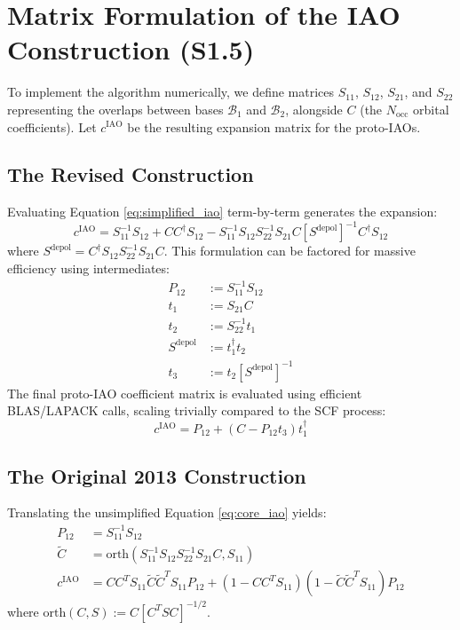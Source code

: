 \documentclass[11pt]{article}
\begin{document}
\vspace{0.5cm}

\section{Matrix Formulation of the IAO Construction (S1.5)}

To implement the algorithm numerically, we define matrices $S_{11}$, $S_{12}$, $S_{21}$, and $S_{22}$ representing the overlaps between bases $\mathcal{B}_1$ and $\mathcal{B}_2$, alongside $C$ (the $N_{\text{occ}}$ orbital coefficients). Let $c^{\text{IAO}}$ be the resulting expansion matrix for the proto-IAOs.

\subsection{The Revised Construction}
Evaluating Equation \ref{eq:simplified_iao} term-by-term generates the expansion:
\begin{equation}
    c^{\text{IAO}} = S_{11}^{-1}S_{12} + C C^\dagger S_{12} - S_{11}^{-1}S_{12}S_{22}^{-1}S_{21}C [S^{\text{depol}}]^{-1} C^\dagger S_{12} \label{eq:S40}
\end{equation}
where $S^{\text{depol}} = C^\dagger S_{12} S_{22}^{-1} S_{21} C$. This formulation can be factored for massive efficiency using intermediates:
\begin{align}
    P_{12} &:= S_{11}^{-1} S_{12} \\
    t_1 &:= S_{21} C \\
    t_2 &:= S_{22}^{-1} t_1 \\
    S^{\text{depol}} &:= t_1^\dagger t_2 \\
    t_3 &:= t_2 [S^{\text{depol}}]^{-1}
\end{align}
The final proto-IAO coefficient matrix is evaluated using efficient BLAS/LAPACK calls, scaling trivially compared to the SCF process:
\begin{equation}
    c^{\text{IAO}} = P_{12} + (C - P_{12}t_3)t_1^\dagger \label{eq:S44}
\end{equation}

\subsection{The Original 2013 Construction}
Translating the unsimplified Equation \ref{eq:core_iao} yields:
\begin{align}
    P_{12} &= S_{11}^{-1}S_{12} \\
    \tilde{C} &= \text{orth}(S_{11}^{-1}S_{12}S_{22}^{-1}S_{21}C, S_{11}) \\
    c^{\text{IAO}} &= C C^T S_{11} \tilde{C} \tilde{C}^T S_{11} P_{12} + (1 - C C^T S_{11})(1 - \tilde{C} \tilde{C}^T S_{11}) P_{12}
\end{align}
where $\text{orth}(C, S) := C[C^T S C]^{-1/2}$.
\end{document}
